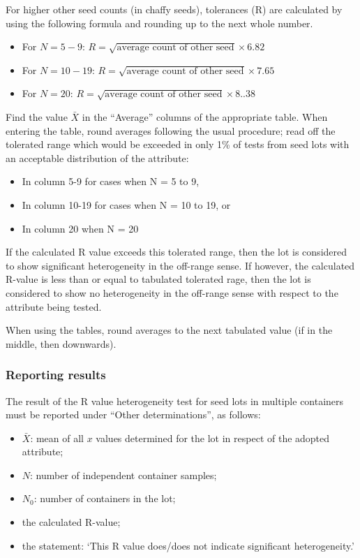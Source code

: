 \documentclass[]{book}
\providecommand{\tightlist}{%
  \setlength{\itemsep}{0pt}\setlength{\parskip}{0pt}}
\begin{document}
For higher other seed counts (in chaffy seeds), tolerances (R) are
calculated by using the following formula and rounding up to the next
whole number.

\begin{itemize}
\tightlist
\item
  For \(N = 5-9\):
  \(R = \sqrt{\textrm{average count of other seed}} \times 6.82\)
\item
  For \(N = 10-19\):
  \(R = \sqrt{\textrm{average count of other seed}} \times 7.65\)
\item
  For \(N = 20\):
  \(R = \sqrt{\textrm{average count of other seed}} \times 8..38\)
\end{itemize}

Find the value \(\bar{X}\) in the ``Average'' columns of the appropriate
table. When entering the table, round averages following the usual
procedure; read off the tolerated range which would be exceeded in only
1\% of tests from seed lots with an acceptable distribution of the
attribute:

\begin{itemize}
\tightlist
\item
  In column 5-9 for cases when N = 5 to 9,
\item
  In column 10-19 for cases when N = 10 to 19, or
\item
  In column 20 when N = 20
\end{itemize}

If the calculated R value exceeds this tolerated range, then the lot is
considered to show significant heterogeneity in the off-range sense. If
however, the calculated R-value is less than or equal to tabulated
tolerated rage, then the lot is considered to show no heterogeneity in
the off-range sense with respect to the attribute being tested.

When using the tables, round averages to the next tabulated value (if in
the middle, then downwards).

\subsubsection{Reporting results}\label{reporting-results-1}

The result of the R value heterogeneity test for seed lots in multiple
containers must be reported under ``Other determinations'', as follows:

\begin{itemize}
\tightlist
\item
  \(\bar{X}\): mean of all \(x\) values determined for the lot in
  respect of the adopted attribute;
\item
  \(N\): number of independent container samples;
\item
  \(N_0\): number of containers in the lot;
\item
  the calculated R-value;
\item
  the statement: `This R value does/does not indicate significant
  heterogeneity.'
\end{itemize}
\end{document}
